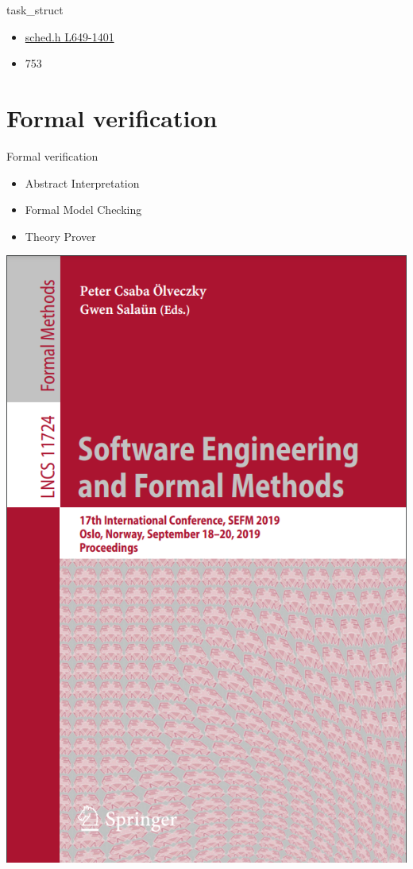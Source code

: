 \documentclass{beamer}
\begin{document}
\begin{CJK*}{UTF8}{bsmi}
\begin{frame}
        task\_struct
        \begin{itemize}
            \item \href{https://github.com/torvalds/linux/blob/master/include/linux/sched.h\#L649-L1401}{sched.h L649-1401}
            \item 753
        \end{itemize}
    \end{frame}

    \section{Formal verification}
    \begin{frame}{{Formal verification}}
        \begin{multicols}{2}
            \begin{itemize}
                \setlength\itemsep{1em}
                \item Abstract Interpretation
                \item Formal Model Checking
                \item Theory Prover
            \end{itemize}
            \cite{Software_Engineering_and_Formal_Methods}
            \includegraphics[height=.8\textheight]{Software_Engineering_and_Formal_Methods.png}
        \end{multicols}


\end{frame}
\end{CJK*}
\end{document}

